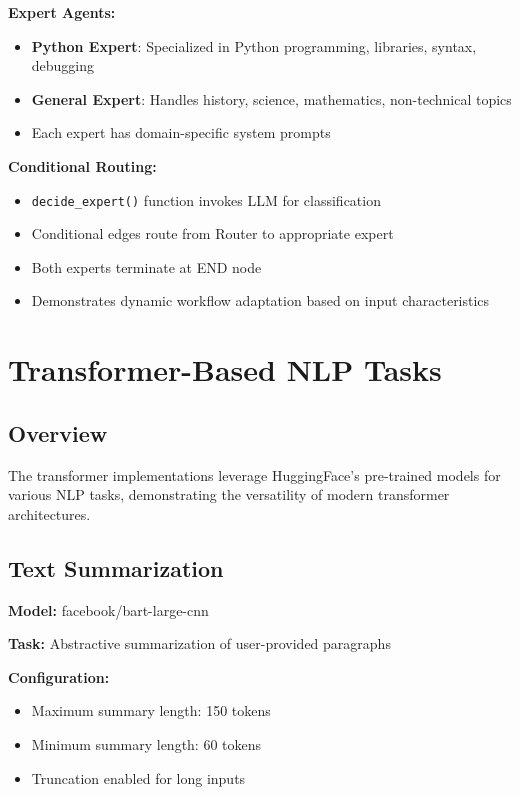 \documentclass[12pt,a4paper]{article}
\begin{document}
\textbf{Expert Agents:}
\begin{itemize}
    \item \textbf{Python Expert}: Specialized in Python programming, libraries, syntax, debugging
    \item \textbf{General Expert}: Handles history, science, mathematics, non-technical topics
    \item Each expert has domain-specific system prompts
\end{itemize}

\textbf{Conditional Routing:}
\begin{itemize}
    \item \texttt{decide\_expert()} function invokes LLM for classification
    \item Conditional edges route from Router to appropriate expert
    \item Both experts terminate at END node
    \item Demonstrates dynamic workflow adaptation based on input characteristics
\end{itemize}

\section{Transformer-Based NLP Tasks}

\subsection{Overview}

The transformer implementations leverage HuggingFace's pre-trained models for various NLP tasks, demonstrating the versatility of modern transformer architectures.

\subsection{Text Summarization}

\textbf{Model:} facebook/bart-large-cnn

\textbf{Task:} Abstractive summarization of user-provided paragraphs

\textbf{Configuration:}
\begin{itemize}
    \item Maximum summary length: 150 tokens
    \item Minimum summary length: 60 tokens
    \item Truncation enabled for long inputs
\end{itemize}
\end{document}
